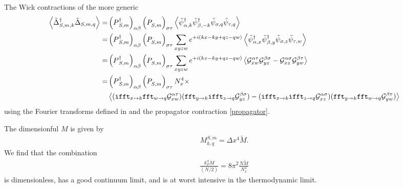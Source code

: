 The Wick contractions of the more generic
\begin{align}
    \left\langle  \tilde{\Delta}{}^{\dagger}_{S,m,k} \tilde{\Delta}_{S,m,q}  \right\rangle
    =&
    \left(P{}^{\dagger}_{S,m}\right)_{\alpha\beta} \left(P^{\phantom{\dagger}}_{S,m}\right)_{\sigma\tau} \left\langle  
        \tilde{\psi}{}^{\dagger}_{\alpha,k} \tilde{\psi}{}^{\dagger}_{\beta,-k}
        \tilde{\psi}_{\sigma,q} \tilde{\psi}_{\tau,q}  \right\rangle
    \nonumber\\
    =&
    \left(P{}^{\dagger}_{S,m}\right)_{\alpha\beta} \left(P^{\phantom{\dagger}}_{S,m}\right)_{\sigma\tau}
    \sum_{xyzw} e^{+i(kx-ky+qz-qw)}
    \left\langle  
        \tilde{\psi}{}^{\dagger}_{\alpha,x} \tilde{\psi}{}^{\dagger}_{\beta,y}
        \tilde{\psi}_{\sigma,z} \tilde{\psi}_{\tau,w}
         \right\rangle
    \nonumber\\
    =&
    \left(P{}^{\dagger}_{S,m}\right)_{\alpha\beta} \left(P^{\phantom{\dagger}}_{S,m}\right)_{\sigma\tau}
    \sum_{xyzw} e^{+i(kx-ky+qz-qw)}
    \left\langle  
            \mathcal{G}^{\alpha\tau}_{xw} \mathcal{G}^{\beta\sigma}_{yz}
        -   \mathcal{G}^{\alpha\sigma}_{xz} \mathcal{G}^{\beta\tau}_{yw}
         \right\rangle
    \nonumber\\
    =&
    \left(P{}^{\dagger}_{S,m}\right)_{\alpha\beta} \left(P^{\phantom{\dagger}}_{S,m}\right)_{\sigma\tau}
    N_x^4 \times
    \\
    &
    \left\langle  
            (\texttt{ifft}_{x \rightarrow k} \texttt{fft}_{w \rightarrow q}\mathcal{G}^{\alpha\tau}_{xw})
            (\texttt{fft}_{y \rightarrow k} \texttt{ifft}_{z \rightarrow q}\mathcal{G}^{\beta\sigma}_{yz})
        -   (\texttt{ifft}_{x \rightarrow k} \texttt{ifft}_{z \rightarrow q}\mathcal{G}^{\alpha\sigma}_{xz})
            (\texttt{fft}_{y \rightarrow k} \texttt{fft}_{w \rightarrow q} \mathcal{G}^{\beta\tau}_{yw})
         \right\rangle
    \nonumber
\end{align}
using the Fourier transforms defined in  and the propagator contraction \eqref{propagator}.

The dimensionful $M$ is given by
\begin{align}
    M^{S,m}_{k,q} = \Delta x^4 \tilde{M}.
\end{align}
We find that the combination
\begin{align}
    \frac{k_F^4 M}{(N/2)} = 8\pi^2 \frac{N \tilde{M}}{N_x^4}
\end{align}
is dimensionless, has a good continuum limit, and is at worst intensive in the thermodynamic limit.

